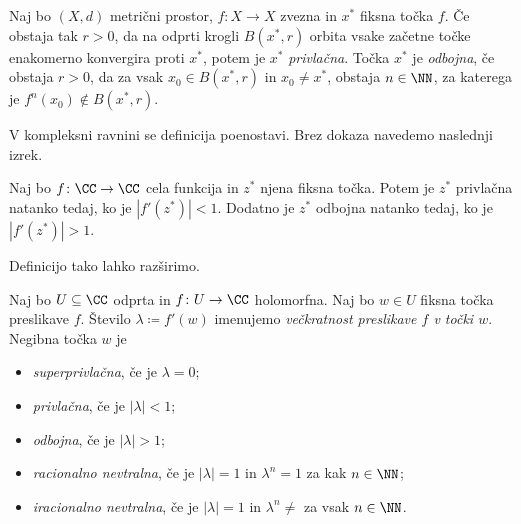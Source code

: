 \begin{definicija}
    Naj bo \((X, d)\) metrični prostor, \(f \colon X \to X\) zvezna in \(x^*\) fiksna točka \(f\). Če obstaja tak \(r > 0\), da na odprti krogli \(B (x^*, r)\) orbita vsake začetne točke enakomerno konvergira proti \(x^*\), potem je \(x^*\) \emph{privlačna}. Točka \(x^*\) je \emph{odbojna}, če obstaja \(r > 0\), da za vsak \(x_0 \in B (x^*, r)\) in \(x_0 \neq x^*\), obstaja \(n \in \NN\), za katerega je \(f^n (x_0) \notin B (x^*, r)\).
\end{definicija}

\noindent V kompleksni ravnini se definicija poenostavi. Brez dokaza navedemo naslednji izrek.

\begin{izrek}
    Naj bo \(f \colon \CC \to \CC\) cela funkcija in \(z^*\) njena fiksna točka. Potem je \(z^*\) privlačna natanko tedaj, ko je \(|f' (z^*)| < 1\). Dodatno je \(z^*\) odbojna natanko tedaj, ko je \(|f' (z^*)| > 1\).
\end{izrek}


\noindent Definicijo tako lahko razširimo.

\begin{definicija}
    Naj bo \(U \subseteq \CC\) odprta in \(f \colon U \to \CC\) holomorfna. Naj bo \(w \in U\) fiksna točka preslikave \(f\). Število \(\lambda \coloneq f' (w)\) imenujemo \emph{večkratnost preslikave \(f\) v točki \(w\)}. Negibna točka \(w\) je
    \begin{itemize}
        \item \emph{superprivlačna}, če je \(\lambda = 0\);
        \item \emph{privlačna}, če je \(|\lambda| < 1\);
        \item \emph{odbojna}, če je \(|\lambda| > 1\);
        \item \emph{racionalno nevtralna}, če je \(|\lambda| = 1\) in \(\lambda^n = 1\) za kak \(n \in \NN\);
        \item \emph{iracionalno nevtralna}, če je \(|\lambda| = 1\) in \(\lambda^n \neq\) za vsak \(n \in \NN\).
    \end{itemize}
\end{definicija}

